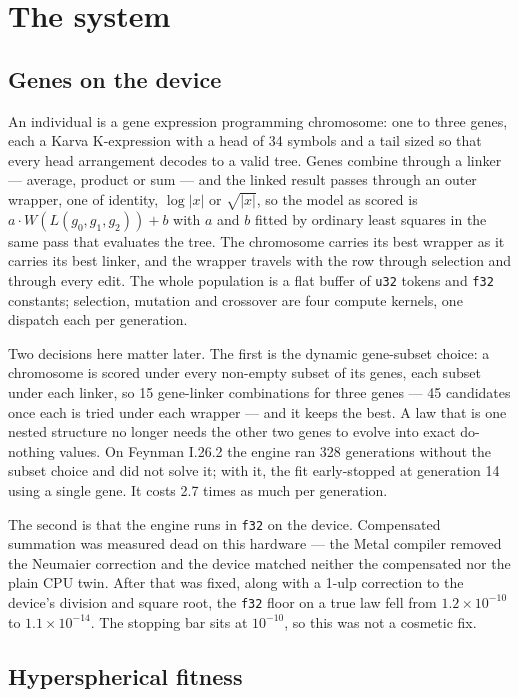 \documentclass[11pt,a4paper]{article}
\begin{document}
\section{The system}
\label{sec:system}

\subsection{Genes on the device}

An individual is a gene expression programming chromosome: one to three genes,
each a Karva K-expression with a head of 34 symbols and a tail sized so that
every head arrangement decodes to a valid tree. Genes combine through a linker
--- average, product or sum --- and the linked result passes through an outer
wrapper, one of identity, $\log|x|$ or $\sqrt{|x|}$, so the model as scored is
$a \cdot W(L(g_0, g_1, g_2)) + b$ with $a$ and $b$ fitted by ordinary least
squares in the same pass that evaluates the tree. The chromosome carries its
best wrapper as it carries its best linker, and the wrapper travels with the row
through selection and through every edit. The whole population is a flat buffer of \texttt{u32}
tokens and \texttt{f32} constants; selection, mutation and crossover are four
compute kernels, one dispatch each per generation.

Two decisions here matter later. The first is the dynamic gene-subset choice: a
chromosome is scored under every non-empty subset of its genes, each subset under
each linker, so 15 gene-linker combinations for three genes --- 45 candidates
once each is tried under each wrapper --- and it keeps the
best. A law that is one nested structure no longer needs the other two genes to
evolve into exact do-nothing values. On Feynman I.26.2 the engine ran 328
generations without the subset choice and did not solve it; with it, the fit
early-stopped at generation 14 using a single gene. It costs 2.7 times as much
per generation.

The second is that the engine runs in \texttt{f32} on the device. Compensated
summation was measured dead on this hardware --- the Metal compiler removed the
Neumaier correction and the device matched neither the compensated nor the plain
CPU twin. After that was fixed, along with a 1-ulp correction to the device's
division and square root, the \texttt{f32} floor on a true law fell from
$1.2\times10^{-10}$ to $1.1\times10^{-14}$. The stopping bar sits at
$10^{-10}$, so this was not a cosmetic fix.

\subsection{Hyperspherical fitness}
\label{sec:hff}
\end{document}
